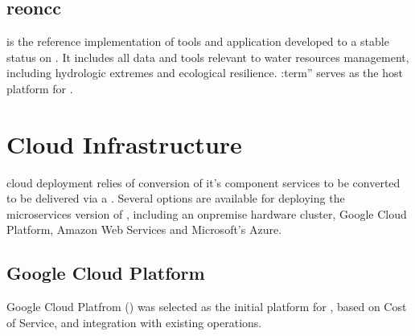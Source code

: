 \documentclass[letterpaper,12pt,english,openany,oneside]{sphinxmanual}
\begin{document}
\sphinxstepscope


\subsection{reoncc}
\label{\detokenize{euidev/development/_autosummary/reoncc:module-reoncc}}\label{\detokenize{euidev/development/_autosummary/reoncc:reoncc}}\label{\detokenize{euidev/development/_autosummary/reoncc::doc}}
\sphinxAtStartPar
{} is the reference implementation of tools and application developed to a stable status on {\hyperref[\detokenize{_static/glossary:term-REONode}]{}}. It includes all data and tools relevant to water resources management, including hydrologic extremes and ecological resilience. :term” serves as the host platform for {\hyperref[\detokenize{_static/glossary:term-REON}]{}}.

\sphinxstepscope


\section{Cloud Infrastructure}
\label{\detokenize{euidev/infrastructure/index:cloud-infrastructure}}\label{\detokenize{euidev/infrastructure/index::doc}}
\sphinxAtStartPar
{\hyperref[\detokenize{_static/glossary:term-RGVFlood.com}]{}} cloud deployment relies of conversion of it’s component services to be converted to be delivered via a {\hyperref[\detokenize{_static/glossary:term-Microservices-Architecture}]{}}. Several options are available for deploying the microservices version of {\hyperref[\detokenize{_static/glossary:term-RGVFlood.com}]{}}, including an on\sphinxhyphen{}premise hardware cluster, Google Cloud Platform, Amazon Web Services and Microsoft’s Azure.


\subsection{Google Cloud Platform}
\label{\detokenize{euidev/infrastructure/index:google-cloud-platform}}
\sphinxAtStartPar
Google Cloud Platfrom ({\hyperref[\detokenize{_static/glossary:term-GCP}]{}}) was selected as the initial platform for {\hyperref[\detokenize{_static/glossary:term-RGVFlood.com}]{}}, based on Cost of Service, and integration with existing {\hyperref[\detokenize{_static/glossary:term-RATES}]{}} operations.
\end{document}
